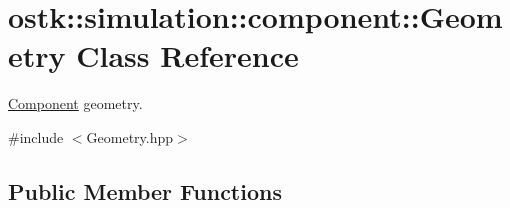 \hypertarget{classostk_1_1simulation_1_1component_1_1_geometry}{}\section{ostk\+:\+:simulation\+:\+:component\+:\+:Geometry Class Reference}
\label{classostk_1_1simulation_1_1component_1_1_geometry}


\hyperlink{classostk_1_1simulation_1_1_component}{Component} geometry.  




{\ttfamily \#include $<$Geometry.\+hpp$>$}

\subsection*{Public Member Functions}
